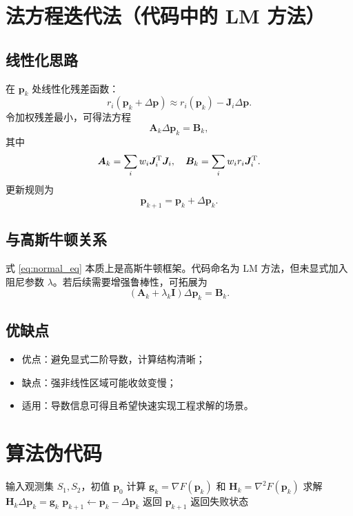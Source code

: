 \section{法方程迭代法（代码中的 LM 方法）}
\subsection{线性化思路}
在 $\bm p_k$ 处线性化残差函数：
\[
r_i(\bm p_k+\Delta\bm p)\approx r_i(\bm p_k)-\bm J_i\Delta\bm p.
\]
令加权残差最小，可得法方程
\begin{equation}
\bm A_k\Delta\bm p_k=\bm B_k,
\label{eq:normal_eq}
\end{equation}
其中
\[
\bm A_k=\sum_i w_i\bm J_i^{\mathrm{T}}\bm J_i,\quad
\bm B_k=\sum_i w_i r_i\bm J_i^{\mathrm{T}}.
\]
更新规则为
\[
\bm p_{k+1}=\bm p_k+\Delta\bm p_k.
\]

\subsection{与高斯牛顿关系}
式 \eqref{eq:normal_eq} 本质上是高斯牛顿框架。代码命名为 LM 方法，但未显式加入阻尼参数 $\lambda$。若后续需要增强鲁棒性，可拓展为
\[
(\bm A_k+\lambda_k\bm I)\Delta\bm p_k=\bm B_k.
\]

\subsection{优缺点}
\begin{itemize}
  \item 优点：避免显式二阶导数，计算结构清晰；
  \item 缺点：强非线性区域可能收敛变慢；
  \item 适用：导数信息可得且希望快速实现工程求解的场景。
\end{itemize}

\section{算法伪代码}
\begin{algorithm}[H]
\caption{融合测角测距的牛顿迭代定位}
\begin{algorithmic}[1]
\State 输入观测集 $S_1,S_2$，初值 $\bm p_0$
\State 计算 $\bm g_k=\nabla F(\bm p_k)$ 和 $\bm H_k=\nabla^2F(\bm p_k)$
\State 求解 $\bm H_k\Delta\bm p_k=\bm g_k$
\State $\bm p_{k+1}\gets \bm p_k-\Delta\bm p_k$
\State 返回 $\bm p_{k+1}$
\EndIf
\EndFor
\State 返回失败状态
\end{algorithmic}
\end{algorithm}

